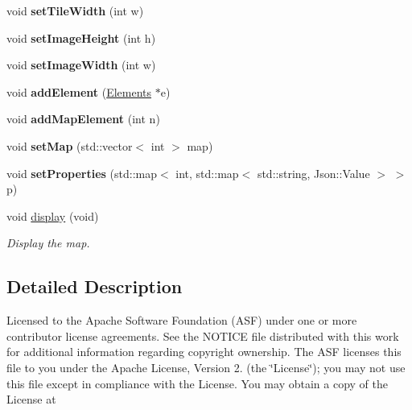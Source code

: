 \begin{DoxyCompactItemize}
\item 
\hypertarget{class_map_a88d4cda4b476ae4ee3487786b0feccd9}{void {\bfseries set\-Tile\-Width} (int w)}\label{class_map_a88d4cda4b476ae4ee3487786b0feccd9}

\item 
\hypertarget{class_map_ada51d21543808fa10d085c3c09bda7f9}{void {\bfseries set\-Image\-Height} (int h)}\label{class_map_ada51d21543808fa10d085c3c09bda7f9}

\item 
\hypertarget{class_map_a38f4a514bf3993ef816b6feda56ab36e}{void {\bfseries set\-Image\-Width} (int w)}\label{class_map_a38f4a514bf3993ef816b6feda56ab36e}

\item 
\hypertarget{class_map_a8b3a39287db471b6faec3cfb281b2da6}{void {\bfseries add\-Element} (\hyperlink{class_elements}{Elements} $\ast$e)}\label{class_map_a8b3a39287db471b6faec3cfb281b2da6}

\item 
\hypertarget{class_map_a4352368e79238539142cf1397c992c65}{void {\bfseries add\-Map\-Element} (int n)}\label{class_map_a4352368e79238539142cf1397c992c65}

\item 
\hypertarget{class_map_a6a1130ac8c3c4d6dcf636759aa970b9b}{void {\bfseries set\-Map} (std\-::vector$<$ int $>$ map)}\label{class_map_a6a1130ac8c3c4d6dcf636759aa970b9b}

\item 
\hypertarget{class_map_a391c92153c0a6134bec05ae442d4fff0}{void {\bfseries set\-Properties} (std\-::map$<$ int, std\-::map$<$ std\-::string, Json\-::\-Value $>$ $>$ p)}\label{class_map_a391c92153c0a6134bec05ae442d4fff0}

\item 
void \hyperlink{class_map_aba8bab272a45054368279643d75fa3ba}{display} (void)
\begin{DoxyCompactList}\small\item\em Display the map. \end{DoxyCompactList}\end{DoxyCompactItemize}


\subsection{Detailed Description}
Licensed to the Apache Software Foundation (A\-S\-F) under one or more contributor license agreements. See the N\-O\-T\-I\-C\-E file distributed with this work for additional information regarding copyright ownership. The A\-S\-F licenses this file to you under the Apache License, Version 2. (the \char`\"{}\-License\char`\"{}); you may not use this file except in compliance with the License. You may obtain a copy of the License at

